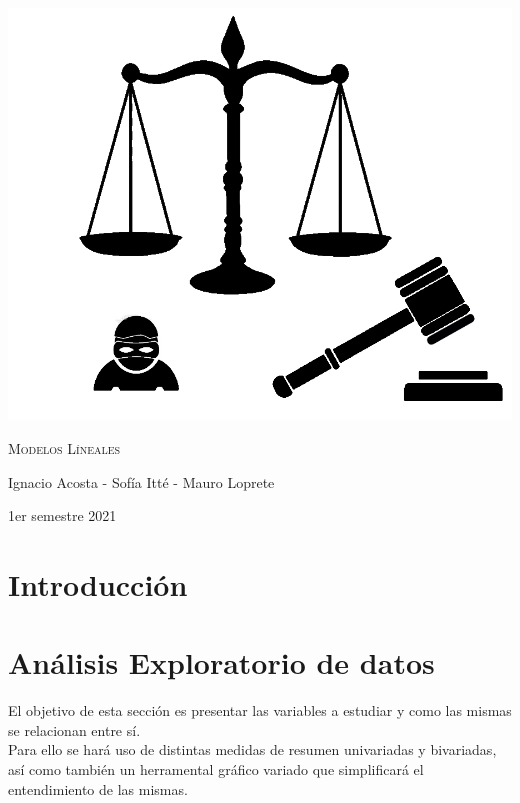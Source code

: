 \documentclass[11pt,a4paper]{article}\usepackage[]{graphicx}\usepackage[]{color}
\begin{document}
\begin{titlepage}
  \centering
    {\scshape\Huge{} \par}
  \vspace{3cm}
  \includegraphics[width=14cm]{CaratulaIgnatenko.png}
  \vfill
  \vfill
  {\scshape\LARGE Modelos Líneales \par}
  \vspace{3cm}
  {\Large Ignacio Acosta - Sofía Itté - Mauro Loprete \par}
  {\Large 1er semestre 2021 \par}
\end{titlepage}
\tableofcontents
{}
\listoffigures
\newpage



\section{Introducción}

\newpage
\section{Análisis Exploratorio de datos}

El objetivo de esta sección es presentar las variables a estudiar y como las mismas se relacionan entre sí.
\\

Para ello se hará uso de distintas medidas de resumen univariadas y bivariadas, así como también un herramental gráfico variado que simplificará el entendimiento de las mismas.
\\
\end{document}
